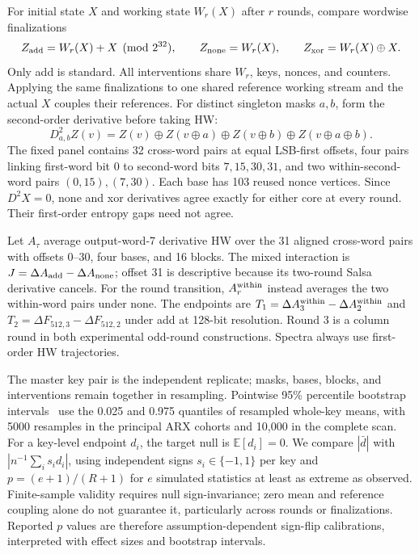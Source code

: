 \documentclass[electronics,article,submit,pdftex,oneauthor]{Definitions/mdpi}
\begin{document}
For initial state $X$ and working state $W_r(X)$ after $r$ rounds, compare wordwise finalizations
\begin{equation}
 Z_{\rm add}=W_r(X)+X\pmod{2^{32}},\qquad
 Z_{\rm none}=W_r(X),\qquad Z_{\rm xor}=W_r(X)\oplus X.
 \label{eq:ffvariants}
\end{equation}
Only add is standard. All interventions share $W_r$, keys, nonces, and counters. Applying the same finalizations to one shared reference working stream and the actual $X$ couples their references. For distinct singleton masks $a,b$, form the second-order derivative before taking HW:
\begin{equation}
 D^2_{a,b}Z(v)=Z(v)\oplus Z(v\oplus a)\oplus Z(v\oplus b)\oplus Z(v\oplus a\oplus b).
 \label{eq:derivative}
\end{equation}
The fixed panel contains 32 cross-word pairs at equal LSB-first offsets, four pairs linking first-word bit 0 to second-word bits $7,15,30,31$, and two within-second-word pairs $(0,15),(7,30)$. Each base has 103 reused nonce vertices. Since $D^2X=0$, none and xor derivatives agree exactly for either core at every round. Their first-order entropy gaps need not agree.

Let $A_\tau$ average output-word-7 derivative HW over the 31 aligned cross-word pairs with offsets 0--30, four bases, and 16 blocks. The mixed interaction is $J=\Delta A_{\rm add}-\Delta A_{\rm none}$; offset 31 is descriptive because its two-round Salsa derivative cancels. For the round transition, $A_r^{\rm within}$ instead averages the two within-word pairs under none. The endpoints are $T_1=\Delta A_3^{\rm within}-\Delta A_2^{\rm within}$ and $T_2=\Delta F_{512,3}-\Delta F_{512,2}$ under add at 128-bit resolution. Round 3 is a column round in both experimental odd-round constructions. Spectra always use first-order HW trajectories.

The master key pair is the independent replicate; masks, bases, blocks, and interventions remain together in resampling. Pointwise 95\% percentile bootstrap intervals~\citep{field2007} use the 0.025 and 0.975 quantiles of resampled whole-key means, with 5000 resamples in the principal ARX cohorts and 10,000 in the complete scan. For a key-level endpoint $d_i$, the target null is $\mathbb E[d_i]=0$. We compare $|\bar d|$ with $|n^{-1}\sum_i s_i d_i|$, using independent signs $s_i\in\{-1,1\}$ per key and $p=(e+1)/(R+1)$ for $e$ simulated statistics at least as extreme as observed. Finite-sample validity requires null sign-invariance; zero mean and reference coupling alone do not guarantee it, particularly across rounds or finalizations. Reported $p$ values are therefore assumption-dependent sign-flip calibrations, interpreted with effect sizes and bootstrap intervals.
\end{document}

